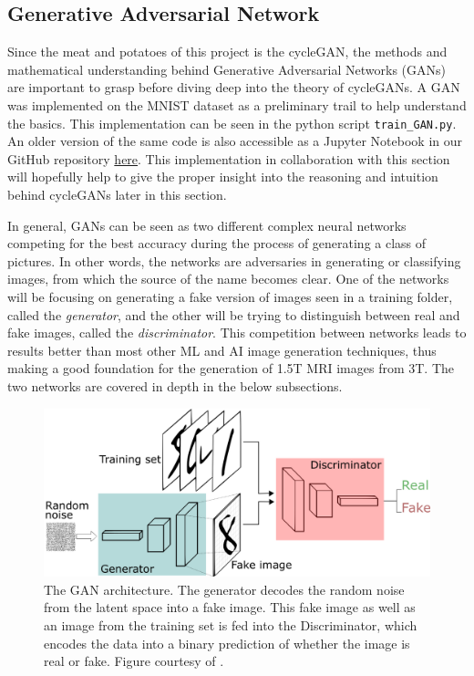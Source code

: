 \documentclass[12pt, fleqn, titlepage]{article}
\begin{document}
\subsection{Generative Adversarial Network}\label{gan}
Since the meat and potatoes of this project is the cycleGAN, the methods and mathematical understanding behind Generative Adversarial Networks (GANs) are important to grasp before diving deep into the theory of cycleGANs. A GAN was implemented on the MNIST dataset as a preliminary trail to help understand the basics. This implementation can be seen in the python script \texttt{train\_GAN.py}. An older version of the same code is also accessible as a Jupyter Notebook in our GitHub repository  \href{https://github.com/oskarwiese/AlzPred/blob/main/preliminary/GAN_MNIST.ipynb}{here}. This implementation in collaboration with this section will hopefully help to give the proper insight into the reasoning and intuition behind cycleGANs later in this section.

In general, GANs can be seen as two different complex neural networks competing for the best accuracy during  the process of generating a class of pictures. In other words, the networks are adversaries in generating or classifying images, from which the source of the name becomes clear. One of the networks will be focusing on generating a fake version of images seen in a training folder, called the \textit{generator}, and the other will be trying to distinguish between real and fake images, called the \textit{discriminator}. This competition between networks leads to results better than most other ML and AI image generation techniques, thus making a good foundation for the generation of 1.5T MRI images from 3T. The two networks are covered in depth in the below subsections.
\begin{figure}[H]
	\centering
	\includegraphics[width=0.7\linewidth]{"imgs/GAN architecture"}
	\caption{The GAN architecture. The generator decodes the random noise from the latent space into a fake image. This fake image as well as an image from the training set is fed into the Discriminator, which encodes the data into a binary prediction of whether the image is real or fake. Figure courtesy of \cite{gan_introduction_towards_datascience}.}
	\label{fig:gan-architecture}
\end{figure}
\end{document}
